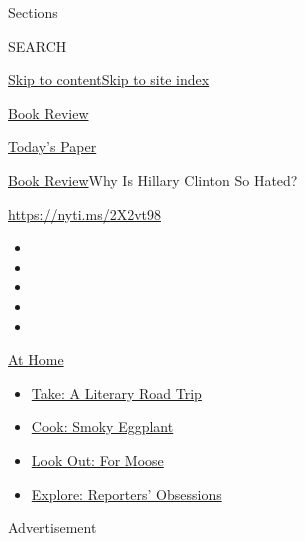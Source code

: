 Sections

SEARCH

\protect\hyperlink{site-content}{Skip to
content}\protect\hyperlink{site-index}{Skip to site index}

\href{https://www.nytimes.com/section/books/review}{Book Review}

\href{https://myaccount.nytimes.com/auth/login?response_type=cookie\&client_id=vi}{}

\href{https://www.nytimes.com/section/todayspaper}{Today's Paper}

\href{/section/books/review}{Book Review}\textbar{}Why Is Hillary
Clinton So Hated?

\url{https://nyti.ms/2X2vt98}

\begin{itemize}
\item
\item
\item
\item
\item
\end{itemize}

\href{https://www.nytimes.com/spotlight/at-home?action=click\&pgtype=Article\&state=default\&region=TOP_BANNER\&context=at_home_menu}{At
Home}

\begin{itemize}
\tightlist
\item
  \href{https://www.nytimes.com/2020/07/28/books/time-for-a-literary-road-trip.html?action=click\&pgtype=Article\&state=default\&region=TOP_BANNER\&context=at_home_menu}{Take:
  A Literary Road Trip}
\item
  \href{https://www.nytimes.com/2020/07/29/magazine/bored-with-your-home-cooking-some-smoky-eggplant-will-fix-that.html?action=click\&pgtype=Article\&state=default\&region=TOP_BANNER\&context=at_home_menu}{Cook:
  Smoky Eggplant}
\item
  \href{https://www.nytimes.com/2020/07/27/travel/moose-michigan-isle-royale.html?action=click\&pgtype=Article\&state=default\&region=TOP_BANNER\&context=at_home_menu}{Look
  Out: For Moose}
\item
  \href{https://www.nytimes.com/interactive/2020/at-home/even-more-reporters-editors-diaries-lists-recommendations.html?action=click\&pgtype=Article\&state=default\&region=TOP_BANNER\&context=at_home_menu}{Explore:
  Reporters' Obsessions}
\end{itemize}

Advertisement

